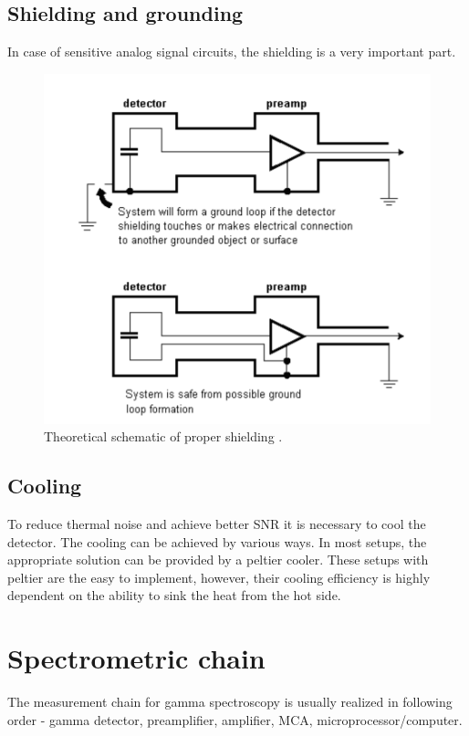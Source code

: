 \subsection{Shielding and grounding}

In case of sensitive analog signal circuits, the shielding is a very important part.

\begin{figure}[H]
 \centering
 \includegraphics[scale=0.35, angle = 0]{./pictures/shielding.png}
 \caption{Theoretical schematic of proper shielding \cite{appCSPnote}.}
 \label{shielding}
 
\end{figure}



\subsection{Cooling}
To reduce thermal noise and achieve better SNR it is necessary to cool the detector. The cooling can be achieved by various ways. In most setups, the appropriate solution can be provided by a peltier cooler. These setups with peltier are the easy to implement, however, their cooling efficiency is highly dependent on the ability to sink the heat from the hot side.

\section{Spectrometric chain}
The measurement chain for gamma spectroscopy is usually realized in following order - gamma detector, preamplifier, amplifier, MCA, microprocessor/computer.


